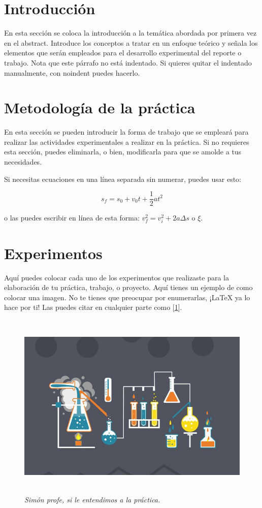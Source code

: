 \section{Introducción}

\noindent En esta sección se coloca la introducción a la temática abordada por primera vez en el abstract. Introduce los conceptos a tratar en un enfoque teórico y señala los elementos que serán empleados para el desarrollo experimental del reporte o trabajo. Nota que este párrafo no está indentado. Si quieres quitar el indentado manualmente, con noindent puedes hacerlo.

\section{Metodología de la práctica}

En esta sección se pueden introducir la forma de trabajo que se empleará para realizar las actividades experimentales a realizar en la práctica. Si no requieres esta sección, puedes eliminarla, o bien, modificarla para que se amolde a tus necesidades.

Si necesitas ecuaciones en una línea separada sin numerar, puedes usar esto:

$$s_f=s_0+v_0t+\frac{1}{2}at^2$$

o las puedes escribir en línea de esta forma: $v_f^2=v_i^2+2a\Delta s$ o $\xi$.

\section{Experimentos}

Aquí puedes colocar cada uno de los experimentos que realizaste para la elaboración de tu práctica, trabajo, o proyecto. Aquí tienes un ejemplo de como colocar una imagen. No te tienes que preocupar por enumerarlas, ¡LaTeX ya lo hace por ti! Las puedes citar en cualquier parte como [\ref{exemploLabel}].

\begin{figure}[h!]
    \centering
    \includegraphics[height=9cm]{Imágenes/DummyExp.jpg}
    \caption{\textit{Simón profe, si le entendimos a la práctica.}}
    \label{exemploLabel}
    \end{figure}

